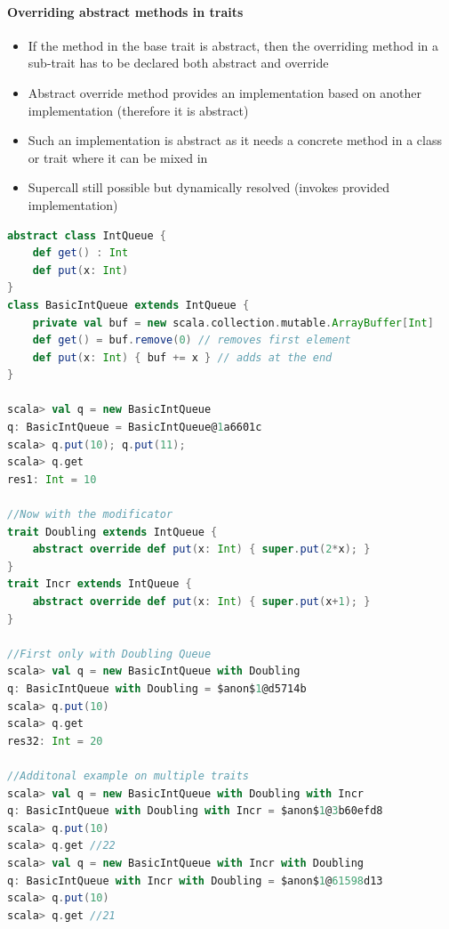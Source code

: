 \clearpage
\hypertarget{overriding-abstract-methods-in-traits}{%
\paragraph{Overriding abstract methods in
traits}\label{overriding-abstract-methods-in-traits}}

\begin{itemize}
\tightlist
\item
  If the method in the base trait is abstract, then the overriding
  method in a sub-trait has to be declared both abstract and override
\item
  Abstract override method provides an implementation based on another
  implementation (therefore it is abstract)
\item
  Such an implementation is abstract as it needs a concrete method in a
  class or trait where it can be mixed in
\item
  Supercall still possible but dynamically resolved (invokes provided
  implementation)
\end{itemize}

\begin{lstlisting}[language=scala,mathescape=false]
abstract class IntQueue {
    def get() : Int
    def put(x: Int)
}
class BasicIntQueue extends IntQueue {
    private val buf = new scala.collection.mutable.ArrayBuffer[Int]
    def get() = buf.remove(0) // removes first element
    def put(x: Int) { buf += x } // adds at the end
}

scala> val q = new BasicIntQueue
q: BasicIntQueue = BasicIntQueue@1a6601c
scala> q.put(10); q.put(11);
scala> q.get
res1: Int = 10

//Now with the modificator
trait Doubling extends IntQueue {
    abstract override def put(x: Int) { super.put(2*x); }
}
trait Incr extends IntQueue {
    abstract override def put(x: Int) { super.put(x+1); }
}

//First only with Doubling Queue
scala> val q = new BasicIntQueue with Doubling
q: BasicIntQueue with Doubling = $anon$1@d5714b
scala> q.put(10)
scala> q.get
res32: Int = 20

//Additonal example on multiple traits
scala> val q = new BasicIntQueue with Doubling with Incr
q: BasicIntQueue with Doubling with Incr = $anon$1@3b60efd8
scala> q.put(10)
scala> q.get //22
scala> val q = new BasicIntQueue with Incr with Doubling
q: BasicIntQueue with Incr with Doubling = $anon$1@61598d13
scala> q.put(10) 
scala> q.get //21
\end{lstlisting}

